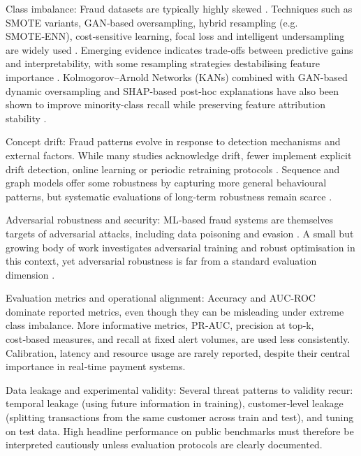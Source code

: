 \documentclass[a4paper,fleqn]{cas-dc}
\begin{document}
Class imbalance: Fraud datasets are typically highly skewed \cite{kennedy_synthesizing_2024}. 
Techniques such as SMOTE variants, GAN‑based oversampling, hybrid resampling (e.g. SMOTE‑ENN), cost‑sensitive learning, focal loss and intelligent undersampling are widely used \cite{el-naby_efficient_2023, ni_fraud_2024, zhao_improved_2024, aruleba_enhanced_2025}. 
Emerging evidence indicates trade‑offs between predictive gains and interpretability, with some resampling strategies destabilising feature importance \cite{huang_imbalanced_2024}.
Kolmogorov–Arnold Networks (KANs) combined with GAN-based dynamic oversampling and SHAP-based post-hoc explanations have also been shown to improve minority-class recall while preserving feature attribution stability \cite{akouhar_dynamic_2025}.

Concept drift: Fraud patterns evolve in response to detection mechanisms and external factors. While many studies acknowledge drift, fewer implement explicit drift detection, online learning or periodic retraining protocols \cite{iqbal_time_2024}. Sequence and graph models offer some robustness by capturing more general behavioural patterns, but systematic evaluations of long‑term robustness remain scarce \cite{zioviris_intelligent_2024}.

Adversarial robustness and security: ML‑based fraud systems are themselves targets of adversarial attacks, including data poisoning and evasion \cite{baabdullah_efficiency_2024}. 
A small but growing body of work investigates adversarial training and robust optimisation in this context, yet adversarial robustness is far from a standard evaluation dimension \cite{lusito_solving_2024}.

Evaluation metrics and operational alignment: Accuracy and AUC‑ROC dominate reported metrics, even though they can be misleading under extreme class imbalance. More informative metrics, PR‑AUC, precision at top‑k, cost‑based measures, and recall at fixed alert volumes, are used less consistently. Calibration, latency and resource usage are rarely reported, despite their central importance in real‑time payment systems.

Data leakage and experimental validity: Several threat patterns to validity recur: temporal leakage (using future information in training), customer‑level leakage (splitting transactions from the same customer across train and test), and tuning on test data. High headline performance on public benchmarks must therefore be interpreted cautiously unless evaluation protocols are clearly documented.
\end{document}
